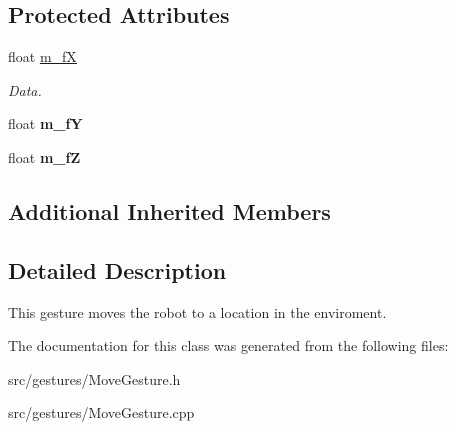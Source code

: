 \subsection*{Protected Attributes}
\begin{DoxyCompactItemize}
\item 
\mbox{\label{class_move_gesture_a3f72cda80fdf5cf316edbde825f6e003}} 
float \hyperlink{class_move_gesture_a3f72cda80fdf5cf316edbde825f6e003}{m\+\_\+fX}
\begin{DoxyCompactList}\small\item\em Data. \end{DoxyCompactList}\item 
\mbox{\label{class_move_gesture_ad44b852220d31a6169edd297956984fc}} 
float {\bfseries m\+\_\+fY}
\item 
\mbox{\label{class_move_gesture_a0e69954b50055b6e68e7f12495ee1a7d}} 
float {\bfseries m\+\_\+fZ}
\end{DoxyCompactItemize}
\subsection*{Additional Inherited Members}


\subsection{Detailed Description}
This gesture moves the robot to a location in the enviroment. 

The documentation for this class was generated from the following files\+:\begin{DoxyCompactItemize}
\item 
src/gestures/Move\+Gesture.\+h\item 
src/gestures/Move\+Gesture.\+cpp\end{DoxyCompactItemize}
